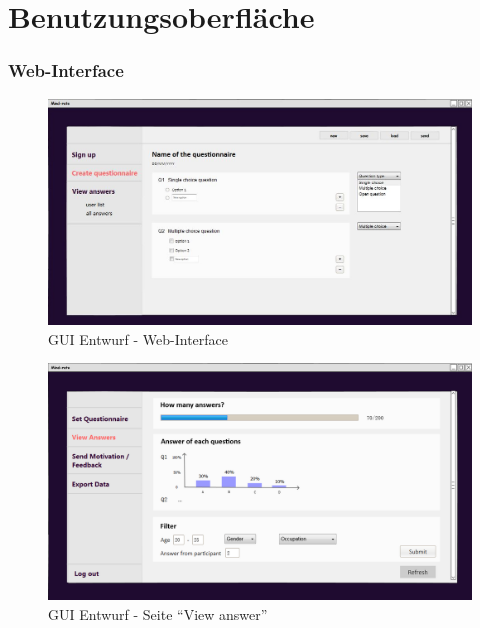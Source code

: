 \documentclass[a4paper]{scrreprt}
\begin{document}
    \chapter{Benutzungsoberfläche}
        \subsection{Web-Interface}
            \begin{figure}[ht]
                \centering
                \includegraphics[scale = 0.4]{web.jpg}
                \caption{GUI Entwurf - Web-Interface}
            \end{figure}

            \begin{figure}[ht]
                \centering
                \includegraphics[scale=0.25]{web_ViewAnswer.png}
                \caption{GUI Entwurf - Seite ``View answer''}
                \label{web_ViewAnswer}
            \end{figure}
    
\end{document}
